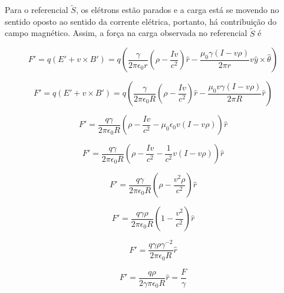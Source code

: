 \documentclass[10pt,a4paper]{article}
\begin{document}
\begin{enumerate}
	Para o referencial $\tilde{S}$, os elétrons estão parados e a carga está se movendo no sentido oposto ao sentido da corrente elétrica, portanto, há contribuição do campo magnético. Assim, a força na carga observada no referencial $\tilde{S}$ é
	
	\begin{equation*}
		F\prime =  q (E\prime + v\times B\prime) = q \left(\dfrac{\gamma}{2\pi\epsilon_0 r} \left(\rho 
		-\dfrac{Iv}{c^2}\right) \hat{r} - \dfrac{\mu_0 \gamma (I - v\rho)}{2\pi r} v \hat{y}\times\hat{\theta}\right)
	\end{equation*}
	
	\begin{equation*}
		F\prime =  q (E\prime + v\times B\prime) = q \left(\dfrac{\gamma}{2\pi\epsilon_0 R} \left(\rho 
		-\dfrac{Iv}{c^2}\right) \hat{r} - \dfrac{\mu_0 v\gamma (I - v\rho)}{2\pi R}  \hat{r}\right)
	\end{equation*}
	
	\begin{equation*}
		F\prime = \dfrac{q\gamma}{2\pi \epsilon_0R} \left(\rho -\dfrac{Iv}{c^2}- \mu_0 \epsilon_0v (I - v\rho) \right)\hat{r} 
	\end{equation*}
	
	\begin{equation*}
		F\prime = \dfrac{q\gamma}{2\pi \epsilon_0R} \left(\rho -\dfrac{Iv}{c^2}-\dfrac{1}{c^2}v (I - v\rho) \right)\hat{r} 
	\end{equation*}
	
	\begin{equation*}
		F\prime = \dfrac{q\gamma}{2\pi \epsilon_0R} \left(\rho -\dfrac{v^2\rho}{c^2} \right)\hat{r} 
	\end{equation*}
	
	\begin{equation*}
		F\prime = \dfrac{q\gamma\rho}{2\pi \epsilon_0R} \left(1 -\dfrac{v^2}{c^2} \right)\hat{r} 
	\end{equation*}
	
	\begin{equation*}
		F\prime = \dfrac{q\gamma\rho\gamma^{-2}}{2\pi \epsilon_0R}\hat{r} 
	\end{equation*}
	
	\begin{equation*}
		F\prime = \dfrac{q\rho}{2\gamma\pi \epsilon_0R}\hat{r} = \dfrac{F}{\gamma}
	\end{equation*}
\end{enumerate}
\end{document}
